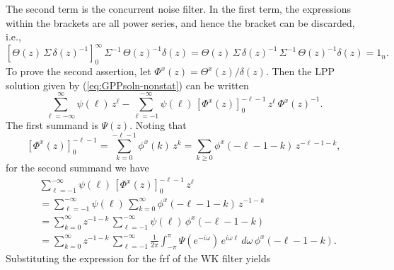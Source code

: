 \documentclass[a4paper]{book}
\begin{document}
  The second term is the concurrent noise filter.  In the first term,
  the expressions within the brackets are all power series, and hence
  the bracket can be discarded, i.e.,
\[
 { \left[  \Theta (z) \, \Sigma \, {\delta (z)}^{-1} \right] }_0^{\infty}
 \, \Sigma^{-1} \, { \Theta (z) }^{-1} \delta (z)
 =  \Theta (z) \, \Sigma \, {\delta (z)}^{-1} 
 \, \Sigma^{-1} \, { \Theta (z) }^{-1} \delta (z) = 1_n.
\]
To prove the second assertion, let $\Phi^x (z) = \Theta^x (z) / \delta (z)$.
 Then the LPP solution given by (\ref{eq:GPPsoln-nonstat}) can be written
\[
   \sum_{\ell = -\infty}^{\infty}  \psi  (\ell) \, z^{\ell} -  
 \sum_{\ell =-1}^{-\infty}  \psi  (\ell)  \,    
 { [  \Phi^x (z) ]}_0^{-\ell-1}     \, z^{\ell} \, { \Phi^x (z) }^{-1}.
\]
  The first summand is $\Psi (z)$.    Noting that
\[
    { [  \Phi^x (z) ]}_0^{-\ell-1}  =  \sum_{k=0}^{-\ell-1}  \phi^x (k) \, z^k =
   \sum_{k \geq 0}  \phi^x (-\ell-1-k) \, z^{-\ell-1-k},
\]
for the second summand we have
\begin{align*}
&  \sum_{\ell = -1}^{-\infty}  \psi  (\ell)   \, { [  \Phi^x (z) ]}_0^{-\ell-1} 
\, z^{\ell}   \\
& = \sum_{\ell = -1}^{-\infty}   \psi (\ell)   \,   \sum_{k = 0}^{\infty} 
  \phi^{x}  (-\ell-1-k) \, z^{-1-k} \\
 & =  \sum_{k = 0}^{\infty}    z^{-1-k} \, \sum_{\ell = -1}^{-\infty} \psi (\ell) \, 
   \phi^x  (-\ell-1-k)   \\
  & =  \sum_{k = 0}^{\infty}    z^{-1-k} \, \sum_{\ell = -1}^{-\infty} 
  \frac{1}{2 \pi} \int_{-\pi}^{\pi}  \Psi (e^{-i \omega}) \, e^{i \omega \ell} \, d\omega 
\,  \phi^x  (-\ell-1-k).
\end{align*}
Substituting the expression for the frf of the WK filter yields
\end{document}
